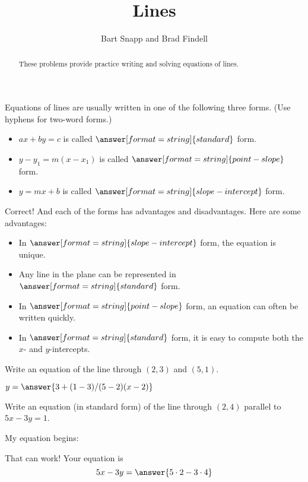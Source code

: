 \documentclass[nooutcomes]{ximera}
\title{Lines}
\author{Bart Snapp and Brad Findell}
\begin{document}
\begin{abstract}
These problems provide practice writing and solving equations of lines. 
\end{abstract}
\maketitle


\begin{problem}
Equations of lines are usually written in one of the following three forms.  (Use hyphens for two-word forms.) 
\begin{itemize}
\item $ax+by=c$ is called $\answer[format=string]{standard}$ form. 
\item $y-y_1=m(x-x_1)$ is called $\answer[format=string]{point-slope}$ form.  
\item $y=mx+b$ is called $\answer[format=string]{slope-intercept}$ form. 
\end{itemize}
\begin{problem}
Correct!  And each of the forms has advantages and disadvantages.  Here are some advantages:  
\begin{itemize}
\item In $\answer[format=string]{slope-intercept}$ form, the equation is unique.  
\item Any line in the plane can be represented in $\answer[format=string]{standard}$ form. 
\item In $\answer[format=string]{point-slope}$ form, an equation can often be written quickly.  
\item In $\answer[format=string]{standard}$ form, it is easy to compute both the $x$- and $y$-intercepts.  
\end{itemize}
\end{problem}
\end{problem}


\begin{problem}
Write an equation of the line through $(2,3)$ and $(5,1)$.  

\begin{prompt}
$y = \answer{3+(1-3)/(5-2)(x-2)}$
\end{prompt}
\end{problem}


\begin{problem}
Write an equation (in standard form) of the line through $(2,4)$ parallel to $5x-3y=1$.  

My equation begins: 
\begin{multipleChoice}
\end{multipleChoice}
\begin{problem}
That can work!  Your equation is
\[
5x-3y=\answer{5\cdot2-3\cdot4}
\]
\end{problem}
\end{problem}
\end{document}
